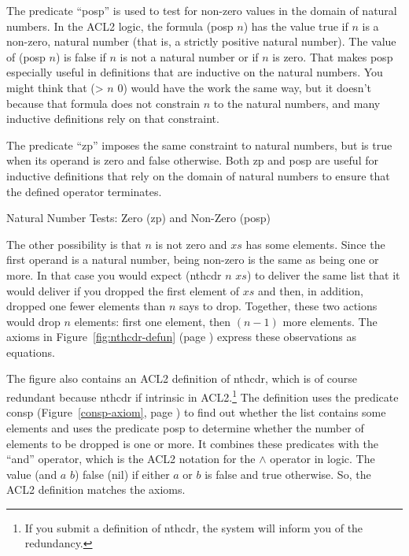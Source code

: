 \begin{aside}
The predicate ``posp'' is used to test for non-zero values
in the domain of natural numbers.
In the ACL2 logic, the formula (posp $n$) has the value true if $n$ is
a non-zero, natural number (that is, a strictly positive natural number).
The value of (posp $n$) is false if $n$ is not a natural number
or if $n$ is zero.
That makes posp especially useful
in definitions that are inductive on the natural numbers.
You might think that (> $n$ 0) would have the
work the same way, but it doesn't because that formula
does not constrain $n$ to the natural numbers,
and many inductive definitions rely on that constraint.

The predicate ``zp'' imposes the same constraint to natural numbers,
but is true when its operand is zero and false otherwise.
Both zp and posp are useful for inductive definitions that
rely on the domain of natural numbers to ensure that the
defined operator terminates.
\caption{Natural Number Tests: Zero (zp) and Non-Zero (posp)}
\label{zp-def}
\end{aside}

The other possibility is that $n$ is not zero and $xs$ has some elements.
Since the first operand is a natural number,
being non-zero is the same as being one or more.
In that case you would expect (nthcdr $n$ $xs$) to deliver
the same list that it would deliver
if you dropped the first element of $xs$
and then, in addition, dropped one fewer elements than $n$ says to drop.
Together, these two actions would drop $n$ elements:
first one element, then $(n - 1)$ more elements.
The axioms in Figure~\ref{fig:nthcdr-defun} (page \pageref{fig:nthcdr-defun})
express these observations as equations.

The figure also contains an ACL2 definition of nthcdr, which
is of course redundant because nthcdr if intrinsic in ACL2.\footnote{If
you submit a definition of nthcdr,
the system will inform you of the redundancy.}
The definition uses the predicate consp
(Figure~\ref{consp-axiom}, page \pageref{consp-axiom})
to find out whether the list contains some elements and
uses the predicate
\label{posp-def} posp
to determine whether
the number of elements to be dropped is one or more.
It combines these predicates with the ``and'' operator,
which is the ACL2 notation for the $\wedge$ operator in logic.
\label{and-op=informal}
The value (and $a$ $b$) false (nil)
if either $a$ or $b$ is false and true otherwise.
So, the ACL2 definition matches the axioms.


